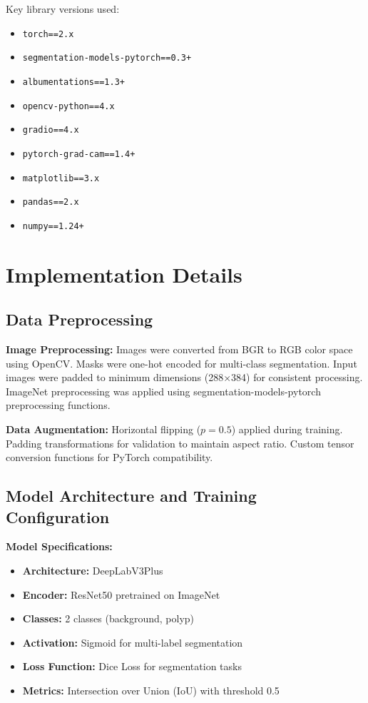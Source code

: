 \documentclass[a4paper,12pt]{report}
\begin{document}
Key library versions used:
\begin{itemize}
    \item \texttt{torch==2.x}
    \item \texttt{segmentation-models-pytorch==0.3+}
    \item \texttt{albumentations==1.3+}
    \item \texttt{opencv-python==4.x}
    \item \texttt{gradio==4.x}
    \item \texttt{pytorch-grad-cam==1.4+}
    \item \texttt{matplotlib==3.x}
    \item \texttt{pandas==2.x}
    \item \texttt{numpy==1.24+}
\end{itemize}



\section{Implementation Details}

\subsection{Data Preprocessing}

\textbf{Image Preprocessing:} Images were converted from BGR to RGB color space using OpenCV. Masks were one-hot encoded for multi-class segmentation. Input images were padded to minimum dimensions (288×384) for consistent processing. ImageNet preprocessing was applied using segmentation-models-pytorch preprocessing functions.

\vspace{1em}

\textbf{Data Augmentation:} Horizontal flipping (\(p=0.5\)) applied during training. Padding transformations for validation to maintain aspect ratio. Custom tensor conversion functions for PyTorch compatibility.

\vspace{1.5em}

\subsection{Model Architecture and Training Configuration}

\textbf{Model Specifications:}
\begin{itemize}
    \item \textbf{Architecture:} DeepLabV3Plus
    \item \textbf{Encoder:} ResNet50 pretrained on ImageNet
    \item \textbf{Classes:} 2 classes (background, polyp)
    \item \textbf{Activation:} Sigmoid for multi-label segmentation
    \item \textbf{Loss Function:} Dice Loss for segmentation tasks
    \item \textbf{Metrics:} Intersection over Union (IoU) with threshold 0.5
\end{itemize}
\end{document}
